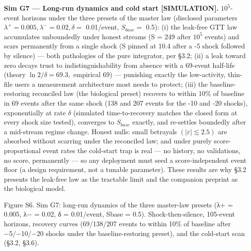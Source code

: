 \documentclass[
]{article}
\begin{document}
\textbf{Sim G7 --- Long-run dynamics and cold start {[}SIMULATION{]}.}
\(10^{5}\)-event horizons under the three presets of the master law
(disclosed parameters
\(\lambda^{+} = 0.005, \lambda^{-} = 0.02, \delta =\) 0.01/event,
\(S_{base} =\) 0.5): (i) the leak-free GTT law accumulates unboundedly
under honest streams (S = 249 after \(10^{5}\) events) and scars
permanently from a single shock (S pinned at 10.4 after a -5 shock
followed by silence) --- both pathologies of the pure integrator, per
§3.2; (ii) a leak toward zero decays trust to indistinguishability from
absence with a 69-event half-life (theory \(\ln2/\delta = 69.3,\)
empirical 69) --- punishing exactly the low-activity, thin-file users a
measurement architecture most needs to protect; (iii) the
baseline-restoring reconciled law (the biological preset) recovers to
within 10\% of baseline in 69 events after the same shock (138 and 207
events for the -10 and -20 shocks), exponentially at rate \(\delta\)
(simulated time-to-recovery matches the closed form at every shock size
tested), converges to \(S_{base}\) exactly, and re-settles boundedly
after a mid-stream regime change. Honest nulls: small betrayals
\((|\varepsilon| \lesssim 2.5)\) are absorbed without scarring under the
reconciled law; and under purely score-proportional event rates the
cold-start trap is real --- no history, no validations, no score,
permanently --- so any deployment must seed a score-independent event
floor (a design requirement, not a tunable parameter). These results are
why §3.2 presents the leak-free law as the tractable limit and the
companion preprint as the biological model.

Figure S6. Sim G7: long-run dynamics of the three master-law presets
({λ+ = 0.005}, {λ− = 0.02}, {δ = 0.01}/event, {Sbase = 0.5}).
Shock-then-silence, {105}-event horizons, recovery curves (69/138/207
events to within 10\% of baseline after {−5}/{−10}/{−20} shocks under
the baseline-restoring preset), and the cold-start scan (§3.2, §3.6).
\end{document}
